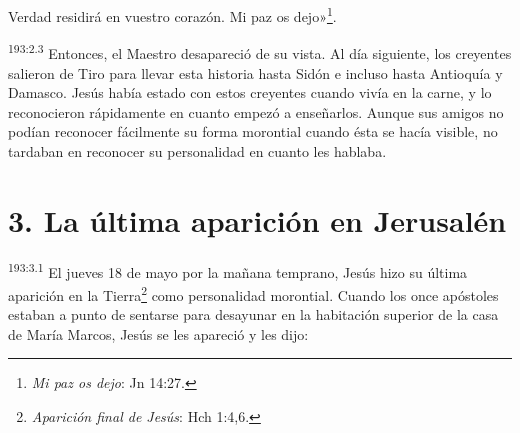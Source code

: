 Verdad residirá en vuestro corazón. Mi paz os dejo»\footnote{\textit{Mi paz os dejo}: Jn 14:27.}.

\par 
\textsuperscript{193:2.3} Entonces, el Maestro desapareció de su vista. Al día siguiente, los creyentes salieron de Tiro para llevar esta historia hasta Sidón e incluso hasta Antioquía y Damasco. Jesús había estado con estos creyentes cuando vivía en la carne, y lo reconocieron rápidamente en cuanto empezó a enseñarlos. Aunque sus amigos no podían reconocer fácilmente su forma morontial cuando ésta se hacía visible, no tardaban en reconocer su personalidad en cuanto les hablaba.

\section*{3. La última aparición en Jerusalén}
\par 
\textsuperscript{193:3.1} El jueves 18 de mayo por la mañana temprano, Jesús hizo su última aparición en la Tierra\footnote{\textit{Aparición final de Jesús}: Hch 1:4,6.} como personalidad morontial. Cuando los once apóstoles estaban a punto de sentarse para desayunar en la habitación superior de la casa de María Marcos, Jesús se les apareció y les dijo:

